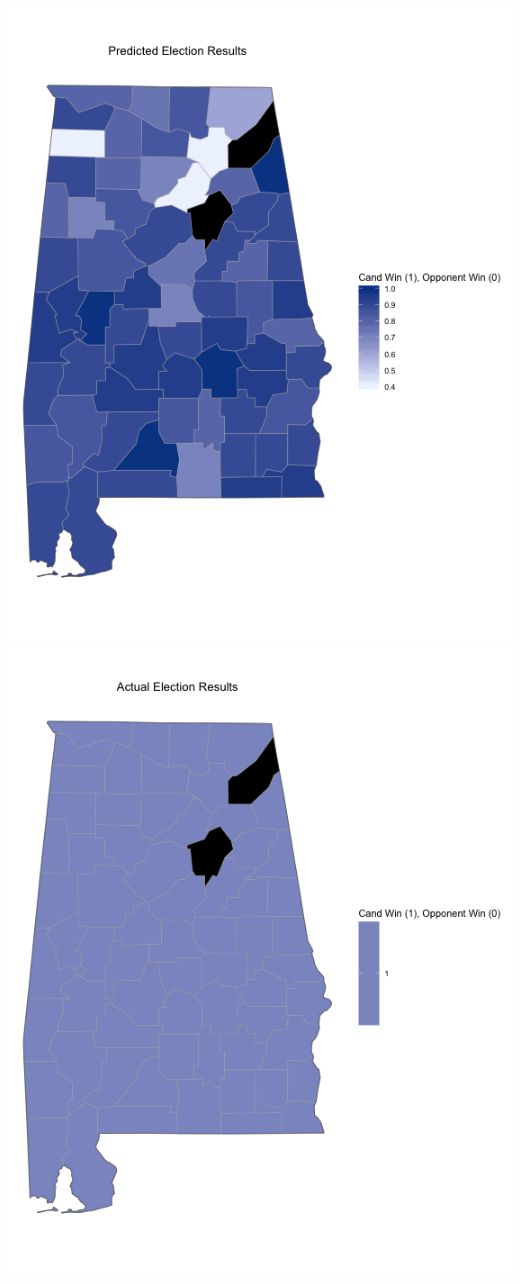 \documentclass[11pt]{article}
\begin{document}
\includegraphics[scale=0.4]{../knn_plots/alabama_predicted.png} \includegraphics[scale=0.4]{../knn_plots/alabama_actual.png}\\
\end{document}
